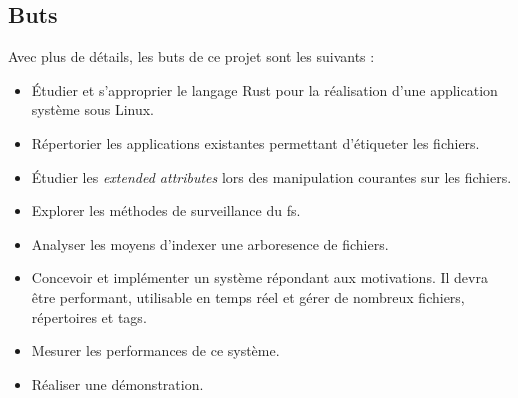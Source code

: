\subsection{Buts}
Avec plus de détails, les buts de ce projet sont les suivants :
\begin{itemize}
    \item Étudier et s'approprier le langage Rust pour la réalisation d'une application système sous Linux.
    \item Répertorier les applications existantes permettant d'étiqueter les fichiers.
    \item Étudier les \textit{extended attributes} lors des manipulation courantes sur les fichiers.
    \item Explorer les méthodes de surveillance du \acrshort{fs}.
    \item Analyser les moyens d'indexer une arboresence de fichiers.
    \item Concevoir et implémenter un système répondant aux motivations. Il devra être performant, 
        utilisable en temps réel et gérer de nombreux fichiers, répertoires et tags.
    \item Mesurer les performances de ce système.
    \item Réaliser une démonstration.
\end{itemize}
